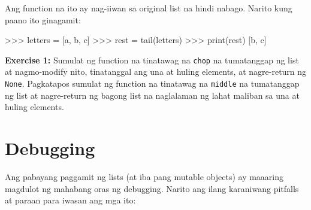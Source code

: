 \documentclass[10pt,]{book}
\newenvironment{Shaded}{}{}
\newcommand{\BuiltInTok}[1]{\textcolor[rgb]{0.00,0.50,0.00}{#1}}
\newcommand{\NormalTok}[1]{#1}
\newcommand{\OperatorTok}[1]{\textcolor[rgb]{0.40,0.40,0.40}{#1}}
\newcommand{\StringTok}[1]{\textcolor[rgb]{0.25,0.44,0.63}{#1}}
\begin{document}
Ang function na ito ay nag-iiwan sa original list na hindi nabago.
Narito kung paano ito ginagamit:

\begin{Shaded}
\begin{Highlighting}[]
\OperatorTok{\textgreater{}\textgreater{}\textgreater{}}\NormalTok{ letters }\OperatorTok{=}\NormalTok{ [}\StringTok{\textquotesingle{}a\textquotesingle{}}\NormalTok{, }\StringTok{\textquotesingle{}b\textquotesingle{}}\NormalTok{, }\StringTok{\textquotesingle{}c\textquotesingle{}}\NormalTok{]}
\OperatorTok{\textgreater{}\textgreater{}\textgreater{}}\NormalTok{ rest }\OperatorTok{=}\NormalTok{ tail(letters)}
\OperatorTok{\textgreater{}\textgreater{}\textgreater{}} \BuiltInTok{print}\NormalTok{(rest)}
\NormalTok{[}\StringTok{\textquotesingle{}b\textquotesingle{}}\NormalTok{, }\StringTok{\textquotesingle{}c\textquotesingle{}}\NormalTok{]}
\end{Highlighting}
\end{Shaded}

\textbf{Exercise 1:} Sumulat ng function na tinatawag na \texttt{chop}
na tumatanggap ng list at nagmo-modify nito, tinatanggal ang una at
huling elements, at nagre-return ng \texttt{None}. Pagkatapos sumulat ng
function na tinatawag na \texttt{middle} na tumatanggap ng list at
nagre-return ng bagong list na naglalaman ng lahat maliban sa una at
huling elements.

\section{Debugging}\label{debugging-7}


Ang pabayang paggamit ng lists (at iba pang mutable objects) ay maaaring
magdulot ng mahabang oras ng debugging. Narito ang ilang karaniwang
pitfalls at paraan para iwasan ang mga ito:
\end{document}
